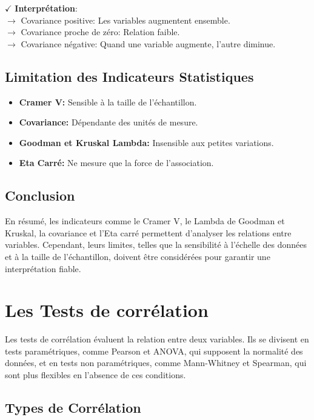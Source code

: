 \textbf{\(\checkmark\)} \textbf{Interprétation}:\\
\noindent \textbf{\(\rightarrow\)} Covariance positive: Les variables augmentent ensemble.\\
\textbf{\(\rightarrow\)} Covariance proche de zéro: Relation faible.\\
\textbf{\(\rightarrow\)} Covariance négative: Quand une variable augmente, l'autre diminue.

\subsection{Limitation des Indicateurs Statistiques}

\begin{itemize}
    \item \textbf{Cramer V:} Sensible à la taille de l'échantillon.
    \item \textbf{Covariance:} Dépendante des unités de mesure.
    \item \textbf{Goodman et Kruskal Lambda:} Insensible aux petites variations.
    \item \textbf{Eta Carré:} Ne mesure que la force de l'association.
\end{itemize}

\subsection{Conclusion}

En résumé, les indicateurs comme le Cramer V, le Lambda de Goodman et Kruskal, la covariance et l'Eta carré permettent d'analyser les relations entre variables. Cependant, leurs limites, telles que la sensibilité à l'échelle des données et à la taille de l'échantillon, doivent être considérées pour garantir une interprétation fiable.

\section{Les Tests de corrélation}

 Les tests de corrélation évaluent la relation entre deux variables. Ils se divisent en tests paramétriques, comme Pearson et ANOVA, qui supposent la normalité des données, et en tests non paramétriques, comme Mann-Whitney et Spearman, qui sont plus flexibles en l'absence de ces conditions.

\subsection*{Types de Corrélation}

